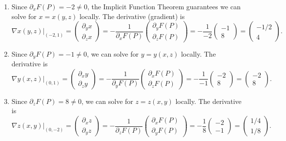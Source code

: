 \begin{exercisesolution}
\begin{enumerate}[label=\textbf{(\alph*)}]
  \item Since $\partial_x F(P) = -2 \neq 0$, the Implicit Function Theorem guarantees we can
    solve for $x = x(y,z)$ locally. The derivative (gradient) is
    \[
    \nabla x(y,z) \Big|_{(-2,1)} = \begin{pmatrix} \partial_y x \\ \partial_z x \end{pmatrix}
      = -\frac{1}{\partial_x F(P)} \begin{pmatrix} \partial_y F(P) \\ \partial_z F(P)
      \end{pmatrix} = -\frac{1}{-2} \begin{pmatrix} -1 \\ 8 \end{pmatrix}
      = \begin{pmatrix} -1/2 \\ 4 \end{pmatrix}.
    \]
  \item Since $\partial_y F(P) = -1 \neq 0$, we can solve for $y = y(x,z)$ locally. The
    derivative is
    \[
    \nabla y(x,z) \Big|_{(0,1)} = \begin{pmatrix} \partial_x y \\ \partial_z y \end{pmatrix}
      = -\frac{1}{\partial_y F(P)} \begin{pmatrix} \partial_x F(P) \\ \partial_z F(P)
      \end{pmatrix} = -\frac{1}{-1} \begin{pmatrix} -2 \\ 8 \end{pmatrix}
      = \begin{pmatrix} -2 \\ 8 \end{pmatrix}.
    \]
  \item Since $\partial_z F(P) = 8 \neq 0$, we can solve for $z = z(x,y)$ locally. The
    derivative is
    \[
    \nabla z(x,y) \Big|_{(0,-2)} = \begin{pmatrix} \partial_x z \\ \partial_y z \end{pmatrix}
      = -\frac{1}{\partial_z F(P)} \begin{pmatrix} \partial_x F(P) \\ \partial_y F(P)
      \end{pmatrix} = -\frac{1}{8} \begin{pmatrix} -2 \\ -1 \end{pmatrix}
      = \begin{pmatrix} 1/4 \\ 1/8 \end{pmatrix}.
    \]
\end{enumerate}
\end{exercisesolution}

